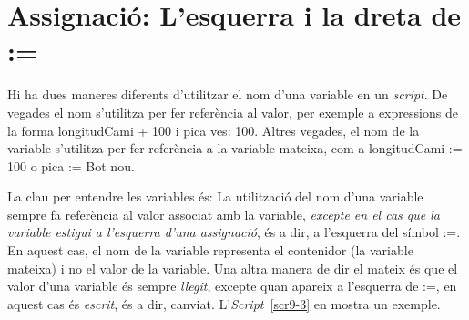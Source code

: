 \section{Assignació: L'esquerra i la dreta de :=}
Hi ha dues maneres diferents d'utilitzar el nom d'una variable en un \emph{script}. De vegades el nom s'utilitza per fer referència al valor, per exemple a expressions de la forma \textsf{longitudCami + 100} i \textsf{pica ves: 100}. Altres vegades, el nom de la variable s'utilitza per fer referència a la variable mateixa, com a \textsf{longitudCami := 100} o \textsf{pica := Bot nou}.

La clau per entendre les variables és: La utilització del nom d'una variable sempre fa referència al valor associat amb la variable, \emph{excepte en el cas que la variable estigui a l'esquerra d'una assignació}, és a dir, a l'esquerra del símbol \textsf{:=}. En aquest cas, el nom de la variable representa el contenidor (la variable mateixa) i no el valor de la variable. Una altra manera de dir el mateix és que el valor d'una variable és sempre \emph{llegit}, excepte quan apareix a l'esquerra de \textsf{:=}, en aquest cas és \emph{escrit}, és a dir, canviat. L'\emph{Script}~\ref{scr9-3} en mostra un exemple.
\newpage
{}


